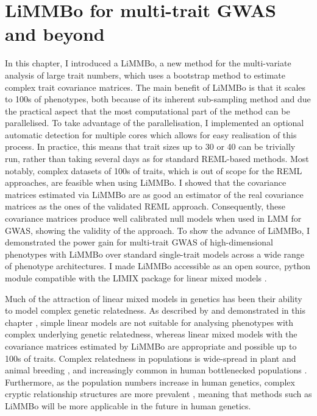 \section{LiMMBo for multi-trait GWAS and beyond}
In this chapter, I introduced a LiMMBo, a new method for the multi-variate analysis of large trait numbers, which uses a bootstrap method to estimate complex trait covariance matrices. The main benefit of LiMMBo is that it scales to 100s of phenotypes, both because of its inherent sub-sampling method and due the practical aspect that the most computational part of the method can be parallelised. To take advantage of the parallelisation, I implemented an optional automatic detection for multiple cores which allows for easy realisation of this process. In practice, this means that trait sizes up to 30 or 40 can be trivially run, rather than taking several days as for standard REML-based methods. Most notably, complex datasets of 100s of traits, which is out of scope for the REML approaches, are feasible when using LiMMBo. I showed that the covariance matrices estimated via LiMMBo are as good an estimator of the real covariance matrices as the ones of the validated REML approach. Consequently, these covariance matrices produce well calibrated null models when used in LMM for GWAS, showing the validity of the approach. To show the advance of LiMMBo, I demonstrated the power gain for multi-trait GWAS of high-dimensional phenotypes with LiMMBo over standard single-trait models across a wide range of phenotype architectures. I made LiMMBo accessible as an open source, python module compatible with the LIMIX package for linear mixed models \citep{Lippert2014}.  

Much of the attraction of linear mixed models in genetics has been their ability to model complex genetic relatedness. As described by \citep{} and demonstrated in this chapter , simple linear models are not suitable for analysing phenotypes with complex underlying genetic relatedness, whereas linear mixed models with the covariance matrices estimated by LiMMBo are appropriate and possible up to 100s of traits. Complex relatedness in populations is wide-spread in plant and animal breeding \citep{}, and increasingly common in human bottlenecked populations \cite{Tachmazidou2013}. Furthermore, as the population numbers increase in human genetics, complex cryptic relationship structures are more prevalent \cite{Reich2001}, meaning that methods such as LiMMBo will be more applicable in the future in human genetics. 

